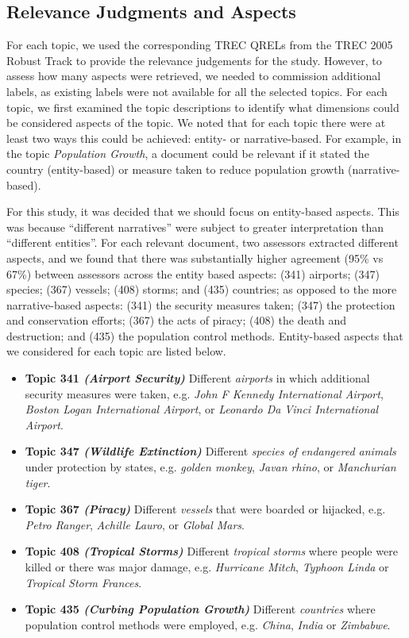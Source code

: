 \subsection{Relevance Judgments and Aspects}\label{sec:method:entities}
For each topic, we used the corresponding TREC QRELs from the TREC 2005 Robust Track to provide the relevance judgements for the study. However, to assess how many aspects were retrieved, we needed to commission additional labels, as existing labels were not available for all the selected topics. For each topic, we first examined the topic descriptions to identify what dimensions could be considered aspects of the topic. We noted that for each topic there were at least two ways this could be achieved: entity- or narrative-based. For example, in the topic \emph{Population Growth}, a document could be relevant if it stated the country (entity-based) or measure taken to reduce population growth (narrative-based).

For this study, it was decided that we should focus on entity-based aspects. This was because ``different narratives'' were subject to greater interpretation than ``different entities''. For each relevant document, two assessors extracted different aspects, and we found that there was substantially higher agreement (95\% vs 67\%) between assessors across the entity based aspects: (341) airports; (347) species; (367) vessels; (408) storms; and  (435) countries; as opposed to the more narrative-based aspects: (341) the security measures taken; (347) the protection and conservation efforts; (367) the acts of piracy; (408) the death and destruction; and (435) the population control methods. Entity-based aspects that we considered for each topic are listed below.

\begin{itemize}
    \item{\textbf{Topic 341 \emph{(Airport Security)}} Different \emph{airports} in which additional security measures were taken, e.g. \emph{John F Kennedy International Airport}, \emph{Boston Logan International Airport}, or \emph{Leonardo Da Vinci International Airport}.}
    \item{\textbf{Topic 347 \emph{(Wildlife Extinction)}} Different \emph{species of endangered animals} under protection by states, e.g. \emph{golden monkey}, \emph{Javan rhino}, or \emph{Manchurian tiger}.}
    \item{\textbf{Topic 367 \emph{(Piracy)}} Different \emph{vessels} that were boarded or hijacked, e.g. \emph{Petro Ranger}, \emph{Achille Lauro}, or \emph{Global Mars}.}
    \item{\textbf{Topic 408 \emph{(Tropical Storms)}} Different \emph{tropical storms} where people were killed or there was major damage, e.g. \emph{Hurricane Mitch}, \emph{Typhoon Linda} or \emph{Tropical Storm Frances}.}
    \item{\textbf{Topic 435 \emph{(Curbing Population Growth)}} Different \emph{countries} where population control methods were employed, e.g. \emph{China}, \emph{India} or \emph{Zimbabwe}.}
\end{itemize}

